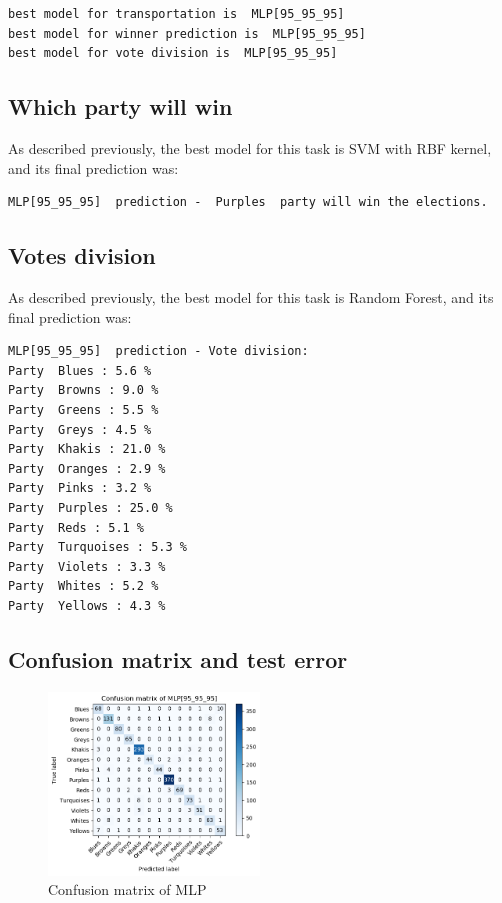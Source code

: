 \documentclass[12pt]{article}
\begin{document}
\small
\begin{verbatim}
best model for transportation is  MLP[95_95_95]
best model for winner prediction is  MLP[95_95_95]
best model for vote division is  MLP[95_95_95]
\end{verbatim}
\normalsize


\subsection{Which party will win}
As described previously, the best model for this task is SVM with RBF kernel, and its final prediction was:
\small
\begin{verbatim}
MLP[95_95_95]  prediction -  Purples  party will win the elections.
\end{verbatim}
\normalsize

\subsection{Votes division}
As described previously, the best model for this task is Random Forest, and its final prediction was:
\small
\begin{verbatim}
MLP[95_95_95]  prediction - Vote division:
Party  Blues : 5.6 %
Party  Browns : 9.0 %
Party  Greens : 5.5 %
Party  Greys : 4.5 %
Party  Khakis : 21.0 %
Party  Oranges : 2.9 %
Party  Pinks : 3.2 %
Party  Purples : 25.0 %
Party  Reds : 5.1 %
Party  Turquoises : 5.3 %
Party  Violets : 3.3 %
Party  Whites : 5.2 %
Party  Yellows : 4.3 %
\end{verbatim}
\normalsize

\subsection{Confusion matrix and test error}
\begin{figure}[htp]
\centering
\includegraphics[width=0.5\textwidth]{confusion_matrix/confusion_fig}
\caption{Confusion matrix of MLP}
\end{figure}
\end{document}
